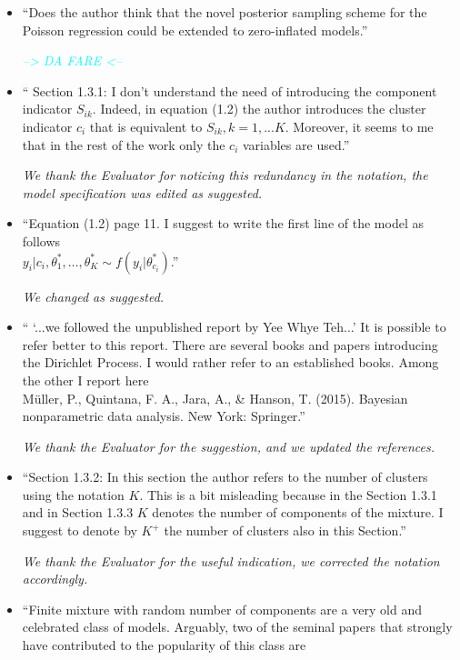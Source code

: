 \documentclass[11pt]{letter}
\begin{document}
\begin{itemize}
%
\item ``Does the author think that the novel posterior sampling scheme for the Poisson regression could be extended to zero-inflated models.''\vskip1mm

{\em 
	\textcolor{cyan}{--> DA FARE <--}
}
\vskip3mm

%
\item `` Section 1.3.1: 
I don't understand the need of introducing the component indicator $S_{ik}$. Indeed, in equation (1.2) the author introduces the cluster indicator $c_i$ that is equivalent to ${S_{ik},k=1,...K}$. Moreover, it seems to me that in the rest of the work only the $c_i$ variables are used.''
\vskip1mm

{\em 
	We thank the Evaluator for noticing this redundancy in the notation, the model specification was edited as suggested.
}
\vskip3mm

%
\item ``Equation (1.2) page 11.
I suggest to write the first line of the model as follows\\
$y_i|c_i,\theta^*_1,\dots,\theta^*_K \sim f(y_i|\theta^*_{c_i})$.''
\vskip1mm

{\em 
	We changed as suggested.
}
\vskip3mm

%
\item `` `...we followed the unpublished report by Yee Whye Teh...'
It is possible to refer better to this report. There are several books and papers introducing the Dirichlet Process. I would rather refer to an established books. Among the other I report here\\
M\"uller, P., Quintana, F. A., Jara, A., \& Hanson, T. (2015). Bayesian nonparametric data analysis. New York: Springer.''\vskip1mm

{\em 
	We thank the Evaluator for the suggestion, and we updated the references.
}
\vskip3mm

%
\item ``Section 1.3.2:
In this section the author refers to the number of clusters using the notation $K$. This is a bit misleading because in the Section 1.3.1 and in Section 1.3.3 $K$ denotes the number of components of the mixture. I suggest to denote by $K^+$ the number of clusters also in this Section.''\vskip1mm

{\em 
	We thank the Evaluator for the useful indication, we corrected the notation accordingly.
}
\vskip3mm

%
\item ``Finite mixture with random number of components are a very old and celebrated class of models. Arguably, two of the seminal papers that strongly have contributed to the popularity of this class are


\end{itemize}
\end{document}
